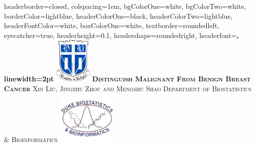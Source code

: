 \documentclass[landscape,a0paper,fontscale=0.285]{baposter} %
\begin{document}
\begin{poster}
{
headerborder=closed, %
colspacing=1em, %
bgColorOne=white, %
bgColorTwo=white, %
borderColor=lightblue, %
headerColorOne=black, %
headerColorTwo=lightblue, %
headerFontColor=white, %
boxColorOne=white, %
textborder=roundedleft, %
eyecatcher=true, %
headerheight=0.1\textheight, %
headershape=roundedright, %
headerfont=\Large\bf\textsc, %
linewidth=2pt %
}
%
{\includegraphics[height=6em]{duke_univ_blue.png}} %
{\bf\textsc{Distinguish Malignant From Benign Breast Cancer}\vspace{0.5em}} %
{\textsc{Xin Liu, Jingzhu Zhou and Mengshu Shao  \hspace{12pt} Department of Biostatistics \& Bioinformatics}} %
{\includegraphics[height=7em]{biostat_logo.jpeg}} 


\end{poster}
\end{document}
